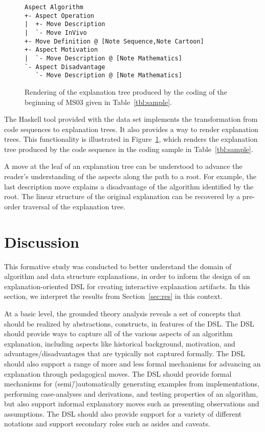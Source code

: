 \documentclass[sigconf]{acmart}
\begin{document}
\begin{figure}
\begin{Verbatim}[fontsize=\small,xleftmargin=2ex]
Aspect Algorithm
+- Aspect Operation
|  +- Move Description
|  `- Move InVivo
+- Move Definition @ [Note Sequence,Note Cartoon]
+- Aspect Motivation
|  `- Move Description @ [Note Mathematics]
`- Aspect Disadvantage
   `- Move Description @ [Note Mathematics]
\end{Verbatim}
\caption{Rendering of the explanation tree produced by the coding of the
beginning of MS03 given in Table~\ref{tbl:sample}.}
\label{fig:tree}
\end{figure}


The Haskell tool provided with the data set implements the transformation from
code sequences to explanation trees. It also provides a way to render
explanation trees. This functionality is illustrated in Figure~\ref{fig:tree},
which renders the explanation tree produced by the code sequence in the coding
sample in Table~\ref{tbl:sample}.


A move at the leaf of an explanation tree can be understood to advance the
reader's understanding of the aspects along the path to a root. For example,
the last description move explains a disadvantage of the algorithm identified
by the root.
%
The linear structure of the original explanation can be recovered by a
pre-order traversal of the explanation tree. 


\section{Discussion}
\label{sec:dis}

This formative study was conducted to better understand the domain of algorithm
and data structure explanations, in order to inform the design of an
explanation-oriented DSL for creating interactive explanation artifacts. In
this section, we interpret the results from Section~\ref{sec:res} in this
context.


At a basic level, the grounded theory analysis reveals a set of concepts that
should be realized by abstractions, constructs, in features of the DSL.
%
The DSL should provide ways to capture all of the various aspects of an
algorithm explanation, including aspects like historical background,
motivation, and advantages/disadvantages that are typically not captured
formally.
%
The DSL should also support a range of more and less formal mechanisms for
advancing an explanation through pedagogical moves. The DSL should provide
formal mechanisms for (semi\=/)automatically generating examples from
implementations, performing case-analyses and derivations, and testing
properties of an algorithm, but also support informal explanatory moves such as
presenting observations and assumptions.
%
The DSL should also provide support for a variety of different notations and
support secondary roles such as asides and caveats.
\end{document}

